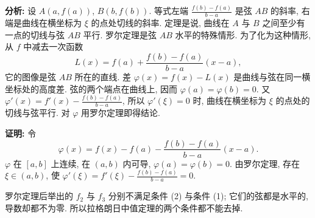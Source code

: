 \documentclass[UTF8,openany]{ctexbook}
\theoremstyle{chinesetextbook}
\newenvironment{cnproof}{\par\indent\textbf{证明:} \ignorespaces}{\par}
\begin{document}
\par\indent\textbf{分析:} 设 $A(a,f(a))$, $B(b,f(b))$. 等式左端 $\displaystyle\frac{f(b)-f(a)}{b-a}$ 是弦 $AB$ 的斜率, 右端是曲线在横坐标为 $\xi$ 的点处切线的斜率. 定理是说, 曲线在 $A$ 与 $B$ 之间至少有一点的切线与弦 $AB$ 平行. 罗尔定理是弦 $AB$ 水平的特殊情形. 为了化为这种情形, 从 $f$ 中减去一次函数
\[
L(x)=f(a)+\frac{f(b)-f(a)}{b-a}(x-a),
\]
它的图像是弦 $AB$ 所在的直线. 差 $\varphi(x)=f(x)-L(x)$ 是曲线与弦在同一横坐标处的高度差. 弦的两个端点在曲线上, 因而 $\varphi(a)=\varphi(b)=0$. 又 $\displaystyle\varphi'(x)=f'(x)-\frac{f(b)-f(a)}{b-a}$, 所以 $\varphi'(\xi)=0$ 时, 曲线在横坐标为 $\xi$ 的点处的切线与弦平行. 对 $\varphi$ 用罗尔定理即得结论.
\begin{cnproof}
令
\[
\varphi(x)=f(x)-f(a)-\frac{f(b)-f(a)}{b-a}(x-a).
\]
$\varphi$ 在 $[a,b]$ 上连续, 在 $(a,b)$ 内可导, $\varphi(a)=\varphi(b)=0$. 由罗尔定理, 存在 $\xi\in(a,b)$, 使 $\displaystyle\varphi'(\xi)=f'(\xi)-\frac{f(b)-f(a)}{b-a}=0$.
\end{cnproof}
罗尔定理后举出的 $f_2$ 与 $f_3$ 分别不满足条件 (2) 与条件 (1); 它们的弦都是水平的, 导数却都不为零. 所以拉格朗日中值定理的两个条件都不能去掉.
\end{document}
